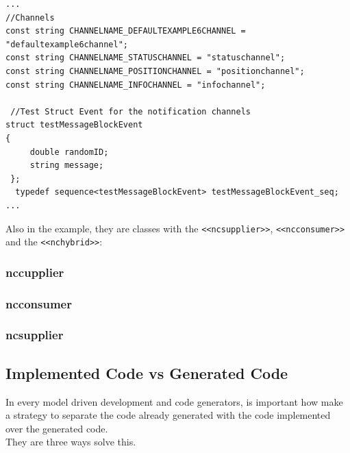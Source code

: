 \begin{center}
\begin{verbatim}
...
//Channels
const string CHANNELNAME_DEFAULTEXAMPLE6CHANNEL = "defaultexample6channel";
const string CHANNELNAME_STATUSCHANNEL = "statuschannel";
const string CHANNELNAME_POSITIONCHANNEL = "positionchannel";
const string CHANNELNAME_INFOCHANNEL = "infochannel";

 //Test Struct Event for the notification channels
struct testMessageBlockEvent
{
     double randomID;  
     string message;
 };
  typedef sequence<testMessageBlockEvent> testMessageBlockEvent_seq;
...
\end{verbatim}
\end{center}

Also in the example, they are classes with the \verb+<<ncsupplier>>+,
\verb+<<ncconsumer>>+ and the \verb+<<nchybrid>>+:

\subsubsection{nccupplier}

\subsubsection{ncconsumer}

\subsubsection {ncsupplier}
 

\subsection{Implemented Code vs Generated Code}
In every model driven development and code generators, is important how make a
strategy to separate the code already generated with the code implemented over
the generated code.\\
They are three ways solve this.

